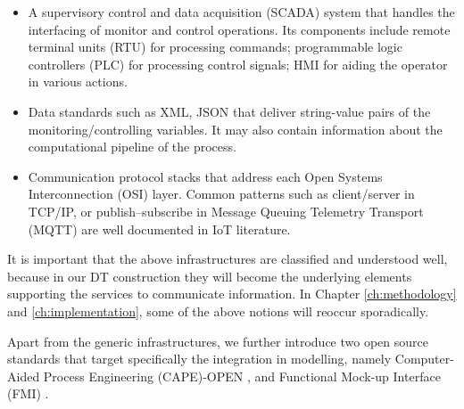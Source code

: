 \begin{itemize}

  \item A supervisory control and data acquisition (SCADA) system that handles the interfacing of monitor and control operations. Its components include remote terminal units (RTU) for processing commands; programmable logic controllers (PLC) for processing control signals; HMI for aiding the operator in various actions.
  
  \item Data standards such as XML, JSON that deliver string-value pairs of the monitoring/controlling variables. It may also contain information about the computational pipeline of the process.
  
  \item Communication protocol stacks that address each Open Systems Interconnection (OSI) layer. Common patterns such as client/server in TCP/IP, or publish–subscribe in Message Queuing Telemetry Transport (MQTT) are well documented in IoT literature.
  
\end{itemize}

It is important that the above infrastructures are classified and understood well, because in our DT construction they will become the underlying elements supporting the services to communicate information. In Chapter \ref{ch:methodology} and \ref{ch:implementation}, some of the above notions will reoccur sporadically.

Apart from the generic infrastructures, we further introduce two open source standards that target specifically the integration in modelling, namely Computer-Aided Process Engineering (CAPE)-OPEN \cite{capeopen}, and Functional Mock-up Interface (FMI) \cite{fmi, Blochwitz2011}.


